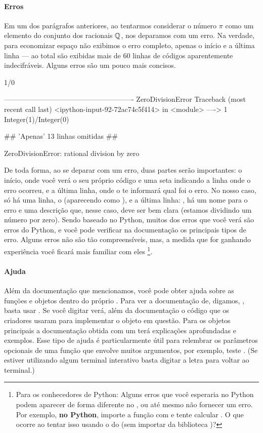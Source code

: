 \paragraph{Erros}

Em um dos parágrafos anteriores, ao tentarmos considerar
o número $\pi$ como um elemento do conjunto dos racionais
$\mathbb{Q}$, nos deparamos com um erro. Na verdade, para economizar
espaço não exibimos o erro completo, apenas o início e a
última linha --- ao total são exibidas mais de $60$ linhas
de códigos aparentemente indecifráveis. Alguns erros
são um pouco mais concisos.
\begin{sageinput}
1/0
\end{sageinput}
\begin{sageoutput}
-------------------------------------------------------
ZeroDivisionError     Traceback (most recent call last)
<ipython-input-92-72ac74c5f414> in <module>
----> 1 Integer(1)/Integer(0)

## 'Apenas' 13 linhas omitidas ##

ZeroDivisionError: rational division by zero
\end{sageoutput}
De toda forma, ao se deparar com um erro, duas partes serão
importantes: o início, onde você verá o seu próprio código e uma
seta indicando a linha onde o erro ocorreu, e a última linha, onde
o \sage te informará qual foi o erro. No nosso caso, só há uma linha, o
 (aparecendo como ), e a última
linha: ,
há um nome para o erro e uma descrição que, nesse caso, deve ser
bem clara (estamos dividindo um número por zero). Sendo baseado no Python,
muitos dos erros que você verá são erros do Python, 
e você pode verificar na documentação os principais tipos de erro.
Alguns erros não são tão compreensíveis, mas, a medida que for
ganhando experiência você ficará mais familiar com eles
\footnote{Para os conhecedores de Python: Alguns erros que
você esperaria no Python podem aparecer de forma diferente
no \sage, ou até mesmo não fornecer um erro. Por exemplo,
\textbf{no Python}, importe a função  com 
 e tente calcular . 
O que ocorre ao tentar isso usando o  
do \sage (sem importar da biblioteca )?}.


\paragraph{Ajuda}
Além da documentação que mencionamos, você pode obter
ajuda sobre as funções e objetos dentro do próprio
\sage. Para ver a documentação de, digamos, ,
basta usar . Se você digitar 
verá, além da documentação o código que os criadores usaram para implementar
o objeto em questão. Para os objetos principais a documentação
obtida com um  terá explicações aprofundadas
e exemplos. Esse tipo de ajuda é particularmente
útil para relembrar os parâmetros opcionais de uma função
que envolve muitos argumentos, por exemplo, teste .
(Se estiver utilizando algum terminal interativo basta digitar
a letra  para voltar ao terminal.)




